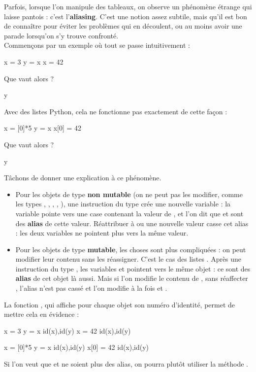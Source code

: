 Parfois, lorsque l'on manipule des tableaux, on observe un phénomène étrange qui laisse pantois : 
c'est l'\textbf{aliasing}. C'est une notion assez subtile, mais qu'il est bon de connaître pour 
éviter les problèmes qui en découlent, ou au moins avoir une parade lorsqu'on s'y trouve 
confronté.\\


Commençons par un exemple où tout se passe intuitivement :
\begin{pyconsole}
x = 3
y = x
x = 42
\end{pyconsole}

Que vaut alors  ? 
\begin{pyconsole}
y
\end{pyconsole}

Avec des listes Python, cela ne fonctionne pas exactement de cette façon : 
\begin{pyconsole}
x = [0]*5
y = x
x[0] = 42
\end{pyconsole}
Que vaut alors  ? 
\begin{pyconsole}
y
\end{pyconsole}
Tâchons de donner une explication à ce phénomène.
\begin{itemize}
  \item Pour les objets de type \textbf{non mutable} (on ne peut pas les modifier, comme les types 
  , , , , ), une instruction du type  
crée une nouvelle variable : la variable  pointe vers une case contenant la valeur de 
, et l'on dit que  et  sont des \textbf{alias} de cette valeur. Réattribuer à 
 ou  une nouvelle valeur casse cet alias : les deux variables ne pointent plus vers la 
même valeur.
  \item Pour les objets de type \textbf{mutable}, les choses sont plus compliquées : on peut modifier 
leur contenu sans les réassigner. C'est le cas des listes \python. Après une instruction du type 
 , les variables  et  pointent vers le même objet : ce sont des 
\textbf{alias} de cet objet là aussi. Mais si l'on modifie le contenu de , sans réaffecter 
, l'alias n'est pas cassé et l'on modifie à la fois  et .
\end{itemize}



La fonction , qui affiche pour chaque objet son \og numéro d'identité\fg, permet de 
mettre cela en évidence :
\begin{multicols}{2}
\begin{pyconsole}
x = 3
y = x
id(x),id(y)
x = 42
id(x),id(y)
\end{pyconsole}


\begin{pyconsole}
x = [0]*5
y = x
id(x),id(y)
x[0] = 42
id(x),id(y)
\end{pyconsole}

\end{multicols}
Si l'on veut que  et  ne soient plus des alias, on pourra plutôt utiliser la méthode 
.

